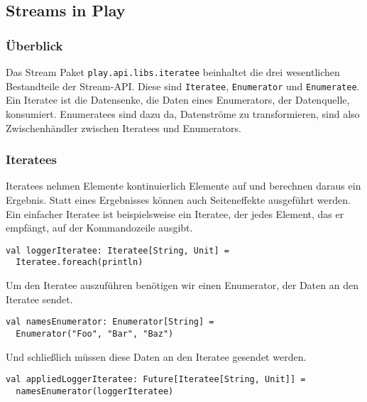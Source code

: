 \documentclass[draft=false
              ,paper=a4
              ,twoside=false
              ,fontsize=11pt
              ,headsepline
              ,BCOR10mm
              ,DIV11
              ]{scrbook}
\begin{document}






\subsection{Streams in Play} %
\label{sub:streams_in_play}


\subsubsection{Überblick} %
\label{sssec:streams_ueberblick}

Das Stream Paket \lstinline|play.api.libs.iteratee| beinhaltet die drei wesentlichen Bestandteile der Stream-API.
Diese sind \lstinline|Iteratee|, \lstinline|Enumerator| und \lstinline|Enumeratee|.
Ein Iteratee ist die Datensenke, die Daten eines Enumerators, der Datenquelle, konsumiert.
Enumeratees sind dazu da, Datenströme zu transformieren, sind also Zwischenhändler zwischen Iteratees und Enumerators.



\subsubsection{Iteratees} %
\label{sssec:iteratees}

Iteratees nehmen Elemente kontinuierlich Elemente auf und berechnen daraus ein Ergebnis.
Statt eines Ergebnisses können auch Seiteneffekte ausgeführt werden.
Ein einfacher Iteratee ist beispielsweise ein Iteratee, der jedes Element, das er empfängt, auf der Kommandozeile ausgibt.
\begin{lstlisting}
val loggerIteratee: Iteratee[String, Unit] =
  Iteratee.foreach(println)
\end{lstlisting}
Um den Iteratee auszuführen benötigen wir einen Enumerator, der Daten an den Iteratee sendet.
\begin{lstlisting}
val namesEnumerator: Enumerator[String] =
  Enumerator("Foo", "Bar", "Baz")
\end{lstlisting}
Und schließlich müssen diese Daten an den Iteratee gesendet werden.
\begin{lstlisting}
val appliedLoggerIteratee: Future[Iteratee[String, Unit]] =
  namesEnumerator(loggerIteratee)
\end{lstlisting}
\end{document}
